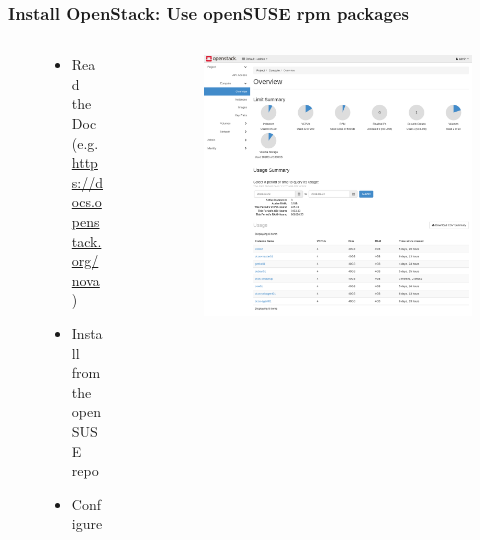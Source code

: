 \documentclass[aspectratio=169,11pt,hyperref={colorlinks=true}]{beamer}
\begin{document}
\begin{frame}
  \frametitle{Install OpenStack: Use openSUSE rpm packages}
  \begin{columns}[T]
    \begin{column}{0.55\textwidth}
      \begin{figure}
        \begin{itemize}
        \item Read the Doc (e.g. \url{https://docs.openstack.org/nova})
        \item Install from the openSUSE repo
        \item Configure
        \end{itemize}
      \end{figure}
    \end{column}
    \begin{column}{0.5\textwidth}
      \begin{figure}
        \includegraphics[width=1.0\textwidth]{openstack-dashboard-instances.png}
      \end{figure}
    \end{column}
  \end{columns}
\end{frame}
\end{document}

